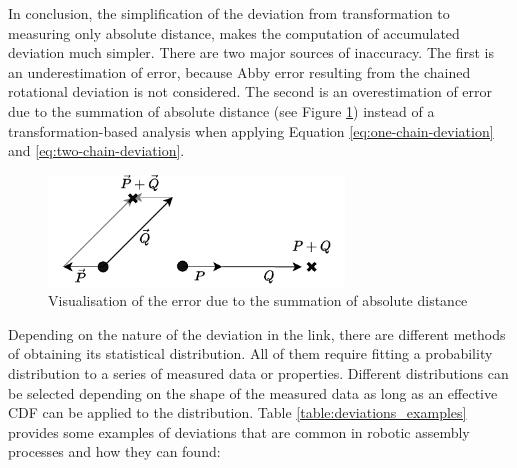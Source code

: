 In conclusion, the simplification of the deviation from transformation to measuring only absolute distance, makes the computation of accumulated deviation much simpler. There are two major sources of inaccuracy. The first is an underestimation of error, because Abby error resulting from the chained rotational deviation is not considered. The second is an overestimation of error due to the summation of absolute distance (see Figure \ref{fig:summation_error}) instead of a transformation-based analysis when applying Equation \ref{eq:one-chain-deviation} and \ref{eq:two-chain-deviation}.

\begin{figure}
    \centering
    \includegraphics[width=0.70\textwidth]{images/09/P + Q Error.pdf}
    \caption{Visualisation of the error due to the summation of absolute distance }
    \label{fig:summation_error}
\end{figure}

Depending on the nature of the deviation in the link, there are different methods of obtaining its statistical distribution. All of them require fitting a probability distribution to a series of measured data or properties. Different distributions can be selected depending on the shape of the measured data as long as an effective CDF can be applied to the distribution. Table \ref{table:deviations_examples} provides some examples of deviations that are 
common in robotic assembly processes and how they can found:

